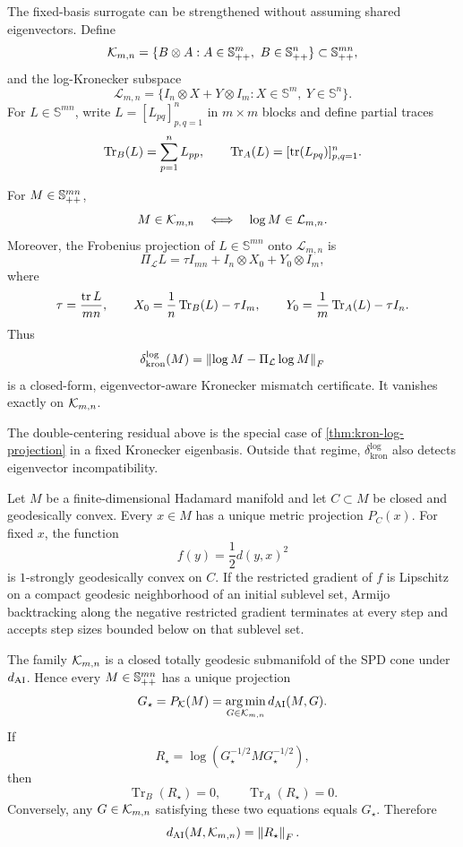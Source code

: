 The fixed-basis surrogate can be strengthened without assuming shared
eigenvectors. Define
\[
  \mathcal K_{m,n}
  =
  \{B\otimes A:A\in\mathbb S_{++}^m,\ B\in\mathbb S_{++}^n\}
  \subset\mathbb S_{++}^{mn},
\]
and the log-Kronecker subspace
\[
  \mathcal L_{m,n}
  =
  \{I_n\otimes X+Y\otimes I_m:
    X\in\mathbb S^m,\ Y\in\mathbb S^n\}.
\]
For \(L\in\mathbb S^{mn}\), write \(L=[L_{pq}]_{p,q=1}^n\) in
\(m\times m\) blocks and define partial traces
\[
  \operatorname{Tr}_B(L)=\sum_{p=1}^n L_{pp},
  \qquad
  \operatorname{Tr}_A(L)=[\operatorname{tr}(L_{pq})]_{p,q=1}^n.
\]

\begin{theorem}
\label{thm:kron-log-projection}
For \(M\in\mathbb S_{++}^{mn}\),
\[
  M\in\mathcal K_{m,n}
  \quad\Longleftrightarrow\quad
  \log M\in\mathcal L_{m,n}.
\]
Moreover, the Frobenius projection of \(L\in\mathbb S^{mn}\) onto
\(\mathcal L_{m,n}\) is
\[
  \Pi_{\mathcal L}L
  =
  \tau I_{mn}+I_n\otimes X_0+Y_0\otimes I_m,
\]
where
\[
  \tau=\frac{\operatorname{tr} L}{mn},\qquad
  X_0=\frac1n\operatorname{Tr}_B(L)-\tau I_m,\qquad
  Y_0=\frac1m\operatorname{Tr}_A(L)-\tau I_n.
\]
Thus
\[
  \delta_{\mathrm{kron}}^{\log}(M)
  =
  \left\lVert \log M-\Pi_{\mathcal L}\log M\right\rVert_F
\]
is a closed-form, eigenvector-aware Kronecker mismatch certificate. It
vanishes exactly on \(\mathcal K_{m,n}\).
\end{theorem}

The double-centering residual above is the special case of
\cref{thm:kron-log-projection} in a fixed Kronecker eigenbasis. Outside that
regime, \(\delta_{\mathrm{kron}}^{\log}\) also detects eigenvector
incompatibility.

\begin{lemma}
\label{lem:hadamard-projection-facts}
Let \(M\) be a finite-dimensional Hadamard manifold and let \(C\subset M\) be
closed and geodesically convex. Every \(x\in M\) has a unique metric
projection \(P_C(x)\). For fixed \(x\), the function
\[
  f(y)=\frac12d(y,x)^2
\]
is \(1\)-strongly geodesically convex on \(C\). If the restricted gradient of
\(f\) is Lipschitz on a compact geodesic neighborhood of an initial sublevel
set, Armijo backtracking along the negative restricted gradient terminates at
every step and accepts step sizes bounded below on that sublevel set.
\end{lemma}

\begin{theorem}
\label{thm:kron-ai-projection}
The family \(\mathcal K_{m,n}\) is a closed totally geodesic submanifold of the SPD
cone under \(d_{\mathrm{AI}}\). Hence every \(M\in\mathbb S_{++}^{mn}\) has a unique projection
\[
  G_\star=P_{\mathcal K}(M)
  =
  \operatorname*{arg\,min}_{G\in\mathcal K_{m,n}}d_{\mathrm{AI}}(M,G).
\]
If
\[
  R_\star=\log(G_\star^{-1/2}MG_\star^{-1/2}),
\]
then
\[
  \operatorname{Tr}_B(R_\star)=0,\qquad
  \operatorname{Tr}_A(R_\star)=0.
\]
Conversely, any \(G\in\mathcal K_{m,n}\) satisfying these two equations equals
\(G_\star\). Therefore
\[
  d_{\mathrm{AI}}(M,\mathcal K_{m,n})=\left\lVert R_\star\right\rVert_F.
\]
\end{theorem}

